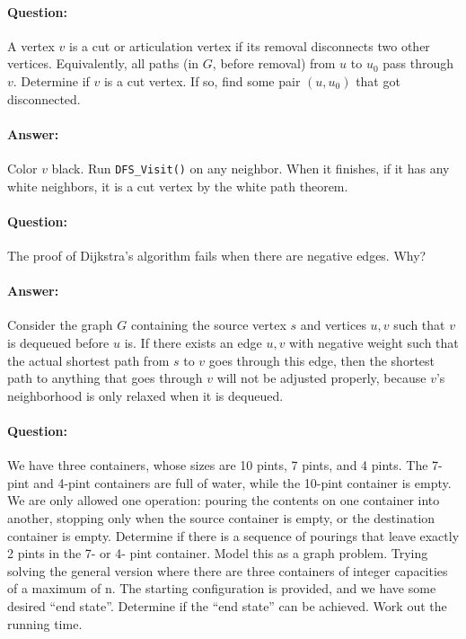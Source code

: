 \documentclass{article}
\newcommand{\code}[1]{\texttt{#1}}
\begin{document}
\paragraph{Question:} A vertex \(v\) is a cut or articulation vertex if its removal disconnects two other vertices. Equivalently, all paths (in \(G\), before removal) from \(u\) to \(u_0\) pass through \(v\).  Determine if \(v\) is a cut vertex. If so, find some pair \((u, u_0)\) that got disconnected.

\paragraph{Answer:} Color \(v\) black. Run \code{DFS\_Visit()} on any neighbor. When it finishes, if it has any white neighbors, it is a cut vertex by the white path theorem.

\paragraph{Question:} The proof of Dijkstra’s algorithm fails when there are negative edges. Why?

\paragraph{Answer:} Consider the graph \(G\) containing the source vertex \(s\) and vertices \(u, v\) such that \(v\) is dequeued before \(u\) is. If there exists an edge \(u,v\) with negative weight such that the actual shortest path from \(s\) to \(v\) goes through this edge, then the shortest path to anything that goes through \(v\) will not be adjusted properly, because \(v\)'s neighborhood is only relaxed when it is dequeued.

\paragraph{Question:} We have three containers, whose sizes are 10 pints, 7 pints, and 4 pints. The 7-pint and 4-pint containers are full of water, while the 10-pint container is empty. We are only allowed one operation: pouring the contents on one container into another, stopping only when the source container is empty, or the destination container is empty. Determine if there is a sequence of pourings that leave exactly 2 pints in the 7- or 4- pint container. Model this as a graph problem. Trying solving the general version where there are three containers of integer capacities of a maximum of n. The starting configuration is provided, and we have some desired “end state”. Determine if the “end state” can be achieved. Work out the running time.
\end{document}

